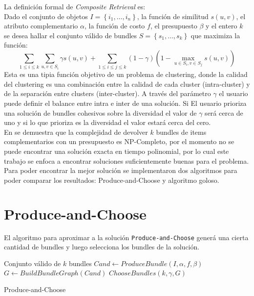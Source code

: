 La definición formal de \textit{Composite Retrieval} es:\\
Dado el conjunto de objetos $I = \left\{i_1, \ldots, i_n \right\}$, la función de similitud $s(u,v)$, el atributo complementario $\alpha$, la función de costo $f$, el presupuesto $\beta$ y el entero $k$ se desea hallar el conjunto válido de bundles $S = \left\{s_1, \ldots, s_k\right\}$ que maximiza la función:
\begin{equation} \label{des:eq-fnObj}
  \sum_{1 \leq i \leq k}{\sum_{u,v \in S_i}{\gamma s(u,v)}} + \sum_{1 \leq i \leq j \leq k}{(1-\gamma) (1-\max_{u \in S_i, v \in S_j}{s(u,v)})}
\end{equation}
Esta es una tipia función objetivo de un problema de clustering, donde la calidad del clustering es una combinación entre la calidad de cada cluster (intra-cluster) y de la separación entre clusters (inter-cluster). A través del parámetro $\gamma$ el usuario puede definir el balance entre intra e inter de una solución. Si El usuario prioriza una solución de bundles cohesivos sobre la diversidad el  valor de $\gamma$ será cerca de uno y si lo que prioriza es la diversidad el valor estará cerca del cero.\\
En \cite{compositeRetrival} se demuestra que la complejidad de devolver $k$ bundles de items complementarios con un presupuesto es NP-Completo, por el momento no se puede encontrar una solución exacta en tiempo polinomial, por lo cual este trabajo se enfoca a encontrar soluciones suficientemente buenas para el problema. Para poder encontrar la mejor solución se implementaron dos algoritmos para poder comparar los resultados: Produce-and-Choose y algoritmo goloso.

\section{Produce-and-Choose}
El algoritmo para aproximar a la solución \texttt{Produce-and-Choose} generá una cierta cantidad de bundles y luego selecciona los bundles de la solución. 

\begin{algorithm}[H]
\begin{algorithmic}[1]
\ENSURE Conjunto válido de $k$ bundles
\STATE $Cand \leftarrow ProduceBundle(I,\alpha,f,\beta)$
\STATE $G \leftarrow BuildBundleGraph(Cand)$
\RETURN $ChooseBundles(k,\gamma,G)$
\end{algorithmic}
\caption{Produce-and-Choose}\label{alg:PAC}
\end{algorithm}

